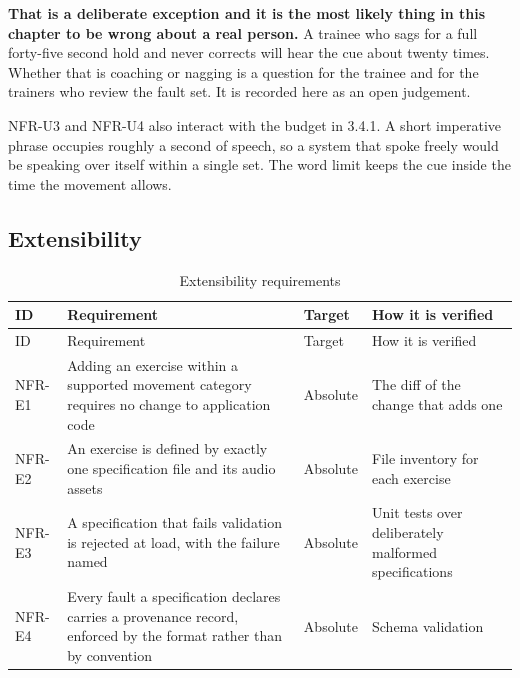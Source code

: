 \textbf{That is a deliberate exception and it is the most likely thing in this chapter to be wrong about a real person.} A trainee who sags for a full forty-five second hold and never corrects will hear the cue about twenty times. Whether that is coaching or nagging is a question for the trainee and for the trainers who review the fault set. It is recorded here as an open judgement.

NFR-U3 and NFR-U4 also interact with the budget in 3.4.1. A short imperative phrase occupies roughly a second of speech, so a system that spoke freely would be speaking over itself within a single set. The word limit keeps the cue inside the time the movement allows.

\subsection{Extensibility}
\label{sec:3.4.6}

{\footnotesize
\setlength{\LTpre}{6pt}\setlength{\LTpost}{8pt}
\begin{longtable}{>{\raggedright\arraybackslash}p{}>{\raggedright\arraybackslash}p{}>{\raggedright\arraybackslash}p{}>{\raggedright\arraybackslash}p{}}
\caption{Extensibility requirements}\\
\toprule
ID & Requirement & Target & How it is verified \\
\midrule
\endfirsthead
\toprule
ID & Requirement & Target & How it is verified \\
\midrule
\endhead
\bottomrule
\endfoot
\bottomrule
\endlastfoot
NFR-E1 & Adding an exercise within a supported movement category requires no change to application code & Absolute & The diff of the change that adds one \\
NFR-E2 & An exercise is defined by exactly one specification file and its audio assets & Absolute & File inventory for each exercise \\
NFR-E3 & A specification that fails validation is rejected at load, with the failure named & Absolute & Unit tests over deliberately malformed specifications \\
NFR-E4 & Every fault a specification declares carries a provenance record, enforced by the format rather than by convention & Absolute & Schema validation \\
\end{longtable}
}

